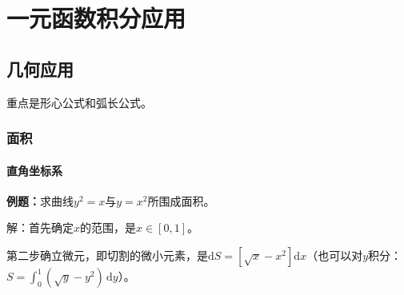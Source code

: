 \documentclass[UTF8, 12pt]{ctexart}
\begin{document}








\section{一元函数积分应用}

\subsection{几何应用}

重点是形心公式和弧长公式。

\subsubsection{面积}

\paragraph{直角坐标系} \leavevmode \medskip

\textbf{例题：}求曲线$y^2=x$与$y=x^2$所围成面积。

解：首先确定$x$的范围，是$x\in[0,1]$。

第二步确立微元，即切割的微小元素，是$\textrm{d}S=[\sqrt{x}-x^2]\textrm{d}x$（也可以对$y$积分：$S=\int_0^1(\sqrt{y}-y^2)\,\textrm{d}y$）。
\end{document}
